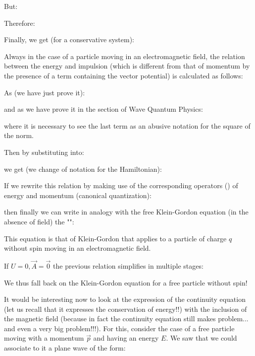 	But:
	
	Therefore:
	
	Finally, we get (for a conservative system):
	
	Always in the case of a particle moving in an electromagnetic field, the relation between the energy and impulsion (which is different from that of momentum by the presence of a term containing the vector potential) is calculated as follows:

	As (we have just prove it):
	
	and as we have prove it in the section of Wave Quantum Physics:
	
	where it is necessary to see the last term as an abusive notation for the square of the norm.
	
	Then by substituting into:
	
	we get (we change of notation for the Hamiltonian):
	
	If we rewrite this relation by making use of the corresponding operators () of energy and momentum (canonical quantization):
	
	then finally we can write in analogy with the free Klein-Gordon equation (in the absence of field) the "":
	
	This equation is that of Klein-Gordon that applies to a particle of charge $q$ without  spin moving in an electromagnetic field.

	If $U=0,\vec{A}=\vec{0}$ the previous relation simplifies in multiple stages:
	
	We thus fall back on the Klein-Gordon equation for a free particle without spin!
	
	It would be interesting now to look at the expression of the continuity equation (let us recall that it expresses the conservation of energy!!) with the inclusion of the magnetic field (because in fact the continuity equation still makes problem... and even a very big problem!!!). For this, consider the case of a free particle moving with a momentum $\vec{p}$ and having an energy $E$. We saw that we could associate to it a plane wave of the form:
	
